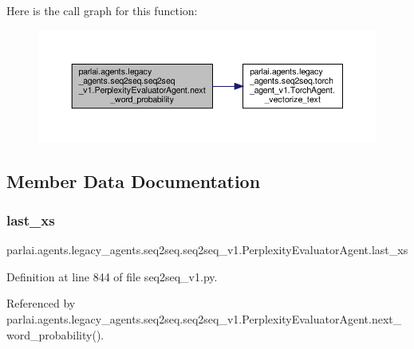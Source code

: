 Here is the call graph for this function\+:
\nopagebreak
\begin{figure}[H]
\begin{center}
\leavevmode
\includegraphics[width=350pt]{classparlai_1_1agents_1_1legacy__agents_1_1seq2seq_1_1seq2seq__v1_1_1PerplexityEvaluatorAgent_a577da407eed3f8757efeab3522f2717b_cgraph}
\end{center}
\end{figure}


\subsection{Member Data Documentation}
\mbox{\label{classparlai_1_1agents_1_1legacy__agents_1_1seq2seq_1_1seq2seq__v1_1_1PerplexityEvaluatorAgent_a637c8434588948fb0367cd749c18e690}} 
\subsubsection{\texorpdfstring{last\+\_\+xs}{last\_xs}}
{\footnotesize\ttfamily parlai.\+agents.\+legacy\+\_\+agents.\+seq2seq.\+seq2seq\+\_\+v1.\+Perplexity\+Evaluator\+Agent.\+last\+\_\+xs}



Definition at line 844 of file seq2seq\+\_\+v1.\+py.



Referenced by parlai.\+agents.\+legacy\+\_\+agents.\+seq2seq.\+seq2seq\+\_\+v1.\+Perplexity\+Evaluator\+Agent.\+next\+\_\+word\+\_\+probability().

